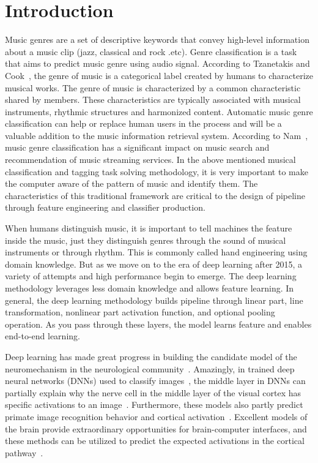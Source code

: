 \documentclass[sn-mathphys]{sn-jnl}%
\theoremstyle{thmstyleone}%
\theoremstyle{thmstyletwo}%
\theoremstyle{thmstylethree}%
\begin{document}
\section{Introduction}\label{sec1}

Music genres are a set of descriptive keywords that convey high-level information about a music clip (jazz, classical and rock .etc).
Genre classification is a task that aims to predict music genre using audio signal.
According to Tzanetakis and Cook~\cite{tzanetakis2002musical}, the genre of music is a categorical label created by humans to characterize musical works.
The genre of music is characterized by a common characteristic shared by members.
These characteristics are typically associated with musical instruments, rhythmic structures and harmonized content.
Automatic music genre classification can help or replace human users in the process and will be a valuable addition to the music information retrieval system.
According to Nam~\cite{nam2018deep}, music genre classification has a significant impact on music search and recommendation of music streaming services.
In the above mentioned musical classification and tagging task solving methodology, it is very important to make the computer aware of the pattern of music and identify them.
The characteristics of this traditional framework are critical to the design of pipeline through feature engineering and classifier production.

When humans distinguish music, it is important to tell machines the feature inside the music, just they distinguish genres through the sound of musical instruments or through rhythm.
This is commonly called hand engineering using domain knowledge.
But as we move on to the era of deep learning after 2015, a variety of attempts and high performance begin to emerge.
The deep learning methodology leverages less domain knowledge and allows feature learning.
In general, the deep learning methodology builds pipeline through linear part, line transformation, nonlinear part activation function, and optional pooling operation.
As you pass through these layers, the model learns feature and enables end-to-end learning.


Deep learning has made great progress in building the candidate model of the neuromechanism in the neurological community~\cite{kubilius2019brain-like}. 
Amazingly, in trained deep neural networks (DNNs) used to classify images~\cite{Deng2009ImageNet}, the middle layer in DNNs can partially explain why the nerve cell in the middle layer of the visual cortex has specific activations to an image~\cite{yamins2014performance,khaligh2014deep,gucclu2015deep,murugesan2017brain,cichy2016deep,yamins2016using}. 
Furthermore, these models also partly predict primate image recognition behavior and cortical activation~\cite{rajalingham2018large,kubilius2016deep}.
Excellent models of the brain provide extraordinary opportunities for brain-computer interfaces,
and these methods can be utilized to predict the expected activations in the cortical pathway~\cite{bashivan2019neural}.
\end{document}
